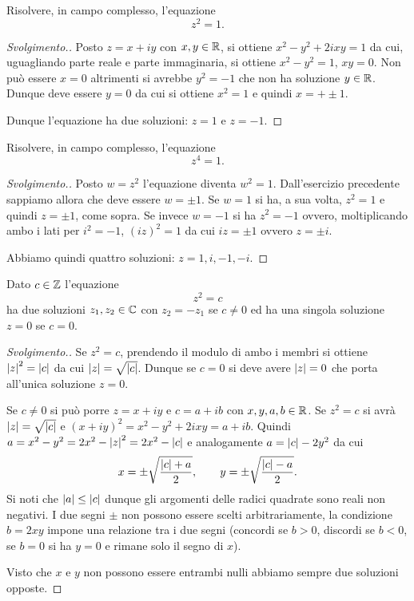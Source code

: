 \begin{exercise}
  \label{ex:radice_uno}
Risolvere, in campo complesso, l'equazione 
\[
  z^2=1.
\]
\end{exercise}
\begin{proof}[Svolgimento.]
Posto $z=x+iy$ con $x,y\in {\mathbb R}$, si ottiene 
$x^2-y^2 + 2 i xy = 1$ da cui, uguagliando parte reale 
e parte immaginaria, si ottiene $x^2-y^2=1$, $xy=0$.
Non può essere $x=0$ altrimenti si avrebbe $y^2=-1$
che non ha soluzione $y\in {\mathbb R}$.
Dunque deve essere $y=0$ da cui si ottiene $x^2=1$ e quindi $x=+\pm 1$.

Dunque l'equazione ha due soluzioni: $z=1$ e $z=-1$.
\end{proof}
\begin{exercise}
  \label{ex:radice_quarta_uno}
Risolvere, in campo complesso, l'equazione
\[
  z^4 = 1.
\]
\end{exercise}
\begin{proof}[Svolgimento.]
Posto $w=z^2$ l'equazione diventa $w^2=1$.
Dall'esercizio precedente sappiamo allora che deve essere 
$w=\pm 1$.
Se $w=1$ si ha, a sua volta, $z^2=1$ e quindi $z=\pm 1$, come sopra.
Se invece $w=-1$ si ha $z^2=-1$ ovvero, 
moltiplicando ambo i lati per $i^2=-1$,
$(iz)^2=1$ da cui $iz=\pm 1$ ovvero $z=\pm i$.

Abbiamo quindi quattro soluzioni: $z=1,i,-1,-i$.
\end{proof}

\begin{exercise}
  \label{ex:radice_complessa}
Dato $c\in {\mathbb Z}$ l'equazione
\[
z^2 = c
\]
ha due soluzioni $z_1,z_2\in {\mathbb C}$ con $z_2=-z_1$ se $c\neq 0$ 
ed ha una singola soluzione $z=0$ se $c=0$.
\end{exercise}
\begin{proof}[Svolgimento.]
Se $z^2=c$, prendendo il modulo di ambo i membri si ottiene 
${\left|z\right|}^2={\left|c\right|}$ da cui ${\left|z\right|}=\sqrt{{\left|c\right|}}$.
Dunque se $c=0$ si deve avere ${\left|z\right|}=0$ che porta all'unica
soluzione $z=0$.

Se $c\neq 0$ si può porre $z=x+iy$ e $c=a+ib$
con $x,y,a,b\in {\mathbb R}$.
Se $z^2=c$ si avrà ${\left|z\right|}=\sqrt{{\left|c\right|}}$
e $(x+iy)^2 = x^2 - y^2 + 2ixy = a + ib$. 
Quindi $a=x^2-y^2 = 2x^2 - {\left|z\right|}^2 = 2x^2- {\left|c\right|}$ 
e analogamente $a = {\left|c\right|}-2y^2$ da cui 
\[
  x = \pm \sqrt{\frac{{\left|c\right|}+a}2}, \qquad
  y = \pm \sqrt{\frac{{\left|c\right|}-a}2}.
\]
Si noti che ${\left|a\right|}\le {\left|c\right|}$ dunque gli argomenti delle 
radici quadrate sono reali non negativi.
I due segni $\pm$ non possono essere scelti arbitrariamente, 
la condizione $b=2xy$ impone una relazione tra i due segni
(concordi se $b>0$, discordi se $b<0$, se $b=0$ si ha $y=0$ 
e rimane solo il segno di $x$).

Visto che $x$ e $y$ non possono essere entrambi nulli abbiamo sempre
due soluzioni opposte.
\end{proof}

